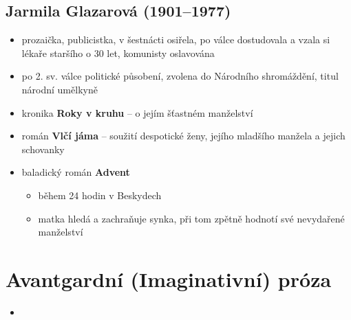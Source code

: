 \subsection{Jarmila Glazarová (1901--1977)}
\begin{itemize}
\item prozaička, publicistka, v šestnácti osiřela, po válce dostudovala a vzala si lékaře staršího o 30 let, komunisty oslavována
\item po 2. sv. válce politické působení, zvolena do Národního shromáždění, titul národní umělkyně
\item kronika \textbf{Roky v kruhu} -- o jejím šťastném manželství
\item román \textbf{Vlčí jáma} -- soužití despotické ženy, jejího mladšího manžela a jejich schovanky
\item baladický román \textbf{Advent}
	\begin{itemize}
	\item během 24 hodin v Beskydech
	\item matka hledá a zachraňuje synka, při tom zpětně hodnotí své nevydařené manželství
	\end{itemize}
\end{itemize}

\section{Avantgardní (Imaginativní) próza}
\begin{itemize}
\item 
\end{itemize}

